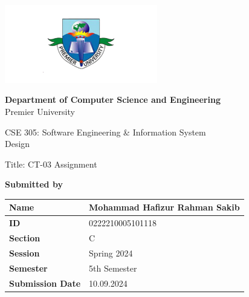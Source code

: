 \documentclass{scrreprt}
\renewcommand{\arraystretch}{1.5} %
\begin{document}
\begin{titlepage}
    \centering
    \begin{center}
        \includegraphics[width=0.5\textwidth]{logo.png} %
    \end{center}
\begin{center}
    \textbf{Department of Computer Science and Engineering}\\
    Premier University
\end{center}
\begin{center}
  \begin{center}
    \huge \textnormal{CSE 305: Software Engineering \& Information System\\ Design}
\end{center}
    \vspace{1in} %
    \Large \textnormal{Title: CT-03 Assignment}
    \vspace{0.5in} %
\end{center}

    \large
    \textbf {Submitted by}\\
   \begin{center}
\renewcommand{\arraystretch}{1.5} %
\begin{tabular}{|p{}|p{}|} %
\hline
\textbf{Name} & Mohammad Hafizur Rahman Sakib \\
\hline
\textbf{ID} & 0222210005101118 \\
\hline
\textbf{Section} & C \\
\hline
\textbf{Session} & Spring 2024 \\
\hline
\textbf{Semester} & 5th Semester \\
\hline
\textbf{Submission Date} & 10.09.2024 \\
\hline
\end{tabular}
\end{center}

    \vspace{0.5in}
 

\end{titlepage}
\end{document}
